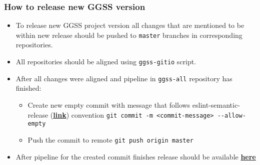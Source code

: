 \subsubsection*{How to release new GGSS version}
\begin{itemize}
    \item To release new GGSS project version all changes that are mentioned to be within new release should be pushed to \lstinline{master} branches in corresponding repositories.
    \item All repositories should be aligned using \lstinline{ggss-gitio} script.
    \item After all changes were aligned and pipeline in \lstinline{ggss-all} repository has finished: \begin{itemize}
        \item Create new empty commit with message that follows eslint-semantic-release (\href{https://github.com/conventional-changelog/conventional-changelog/tree/master/packages/conventional-changelog-eslint}{\textbf{link}}) convention \lstinline{git commit -m <commit-message> --allow-empty}
        \item Push the commit to remote \lstinline{git push origin master}
    \end{itemize}
    \item After pipeline for the created commit finishes release should be available \href{https://gitlab.cern.ch/atlas-trt-dcs-ggss/ggss-all/-/releases}{\textbf{here}} 
\end{itemize}
